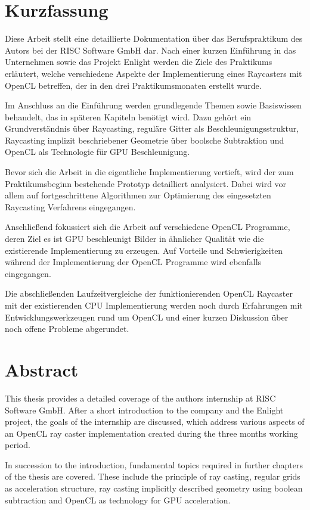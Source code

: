 \chapter*{Kurzfassung}

Diese Arbeit stellt eine detaillierte Dokumentation über das Berufspraktikum des Autors bei der RISC Software GmbH dar. Nach einer kurzen Einführung in das Unternehmen sowie das Projekt Enlight werden die Ziele des Praktikums erläutert, welche verschiedene Aspekte der Implementierung eines Raycasters mit OpenCL betreffen, der in den drei Praktikumsmonaten erstellt wurde.

Im Anschluss an die Einführung werden grundlegende Themen sowie Basiswissen behandelt, das in späteren Kapiteln benötigt wird. Dazu gehört ein Grundverständnis über Raycasting, reguläre Gitter als Beschleunigungsstruktur, Raycasting implizit beschriebener Geometrie über boolsche Subtraktion und OpenCL als Technologie für GPU Beschleunigung.

Bevor sich die Arbeit in die eigentliche Implementierung vertieft, wird der zum Praktikumsbeginn bestehende Prototyp detailliert analysiert. Dabei wird vor allem auf fortgeschrittene Algorithmen zur Optimierung des eingesetzten Raycasting Verfahrens eingegangen.

Anschließend fokussiert sich die Arbeit auf verschiedene OpenCL Programme, deren Ziel es ist GPU beschleunigt Bilder in ähnlicher Qualität wie die existierende Implementierung zu erzeugen. Auf Vorteile und Schwierigkeiten während der Implementierung der OpenCL Programme wird ebenfalls eingegangen.

Die abschließenden Laufzeitvergleiche der funktionierenden OpenCL Raycaster mit der existierenden CPU Implementierung werden noch durch Erfahrungen mit Entwicklungswerkzeugen rund um OpenCL und einer kurzen Diskussion über noch offene Probleme abgerundet.

\pagebreak

\chapter*{Abstract}

This thesis provides a detailed coverage of the authors internship at RISC Software GmbH. After a short introduction to the company and the Enlight project, the goals of the internship are discussed, which address various aspects of an OpenCL ray caster implementation created during the three months working period.

In succession to the introduction, fundamental topics required in further chapters of the thesis are covered. These include the principle of ray casting, regular grids as acceleration structure, ray casting implicitly described geometry using boolean subtraction and OpenCL as technology for GPU acceleration.

